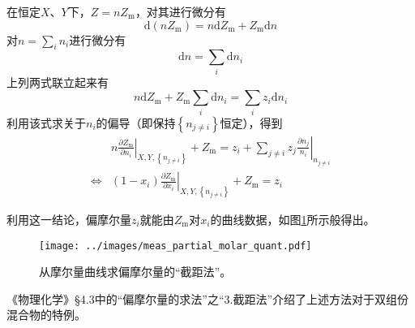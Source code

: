 \documentclass[main.tex]{subfiles}
\begin{document}
在恒定$X$、$Y$下，$Z=n Z_\text{m}$，对其进行微分有
\[\mathrm{d}\left(nZ_\text{m}\right)=n\mathrm{d}Z_\text{m}+Z_\text{m}\mathrm{d}n\]
对$n=\sum_i n_i$进行微分有
\[\mathrm{d}n=\sum_i\mathrm{d}n_i\]
上列两式联立起来有
\[n\mathrm{d}Z_\text{m}+Z_\text{m}\sum_i \mathrm{d}n_i=\sum_i z_i\mathrm{d}n_i\]
利用该式求关于$n_i$的偏导（即保持$\left\{n_{j\neq i}\right\}$恒定），得到
\begin{align*}
&n\left.\frac{\partial Z_\text{m}}{\partial n_i}\right|_{X,Y,\left\{n_{j\neq i}\right\}}+Z_\text{m}=z_i+\sum_{j\neq i}z_j\left.\frac{\partial n_j}{n_i}\right|_{n_{j\neq i}}\\
\Leftrightarrow & \left(1-x_i\right)\left.\frac{\partial Z_\text{m}}{\partial x_i}\right|_{X,Y,\left\{n_{j\neq i}\right\}}+Z_\text{m}=z_i
\end{align*}

利用这一结论，偏摩尔量$z_i$就能由$Z_\text{m}$对$x_i$的曲线数据，如图\ref{fig:meas_partial_molar_quant}所示般得出。

\begin{figure}[h]
    \centering
    \texttt{[image: ../images/meas\_partial\_molar\_quant.pdf]}
    \caption{从摩尔量曲线求偏摩尔量的“截距法”。}
    \label{fig:meas_partial_molar_quant}
\end{figure}

《物理化学》\S 4.3中的“偏摩尔量的求法”之“3.截距法”介绍了上述方法对于双组份混合物的特例。
\end{document}

